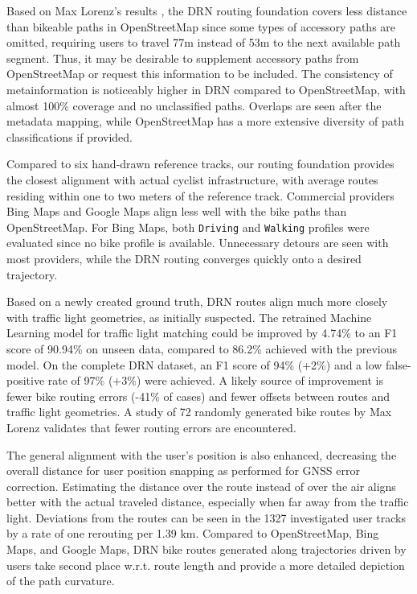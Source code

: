 \begin{Summary}
Based on Max Lorenz's results \cite{lorenz_2022}, the DRN routing foundation covers less distance than bikeable paths in OpenStreetMap since some types of accessory paths are omitted, requiring users to travel 77m instead of 53m to the next available path segment. Thus, it may be desirable to supplement accessory paths from OpenStreetMap or request this information to be included. The consistency of metainformation is noticeably higher in DRN compared to OpenStreetMap, with almost 100\% coverage and no unclassified paths. Overlaps are seen after the metadata mapping, while OpenStreetMap has a more extensive diversity of path classifications if provided.

Compared to six hand-drawn reference tracks, our routing foundation provides the closest alignment with actual cyclist infrastructure, with average routes residing within one to two meters of the reference track. Commercial providers Bing Maps and Google Maps align less well with the bike paths than OpenStreetMap. For Bing Maps, both \texttt{Driving} and \texttt{Walking} profiles were evaluated since no bike profile is available. Unnecessary detours are seen with most providers, while the DRN routing converges quickly onto a desired trajectory. 

Based on a newly created ground truth, DRN routes align much more closely with traffic light geometries, as initially suspected. The retrained Machine Learning model for traffic light matching could be improved by 4.74\% to an F1 score of 90.94\% on unseen data, compared to 86.2\% achieved with the previous model. On the complete DRN dataset, an F1 score of 94\% (+2\%) and a low false-positive rate of 97\% (+3\%) were achieved. A likely source of improvement is fewer bike routing errors (-41\% of cases) and fewer offsets between routes and traffic light geometries. A study of 72 randomly generated bike routes by Max Lorenz \cite{lorenz_2022} validates that fewer routing errors are encountered.

The general alignment with the user's position is also enhanced, decreasing the overall distance for user position snapping as performed for GNSS error correction. Estimating the distance over the route instead of over the air aligns better with the actual traveled distance, especially when far away from the traffic light. Deviations from the routes can be seen in the 1327 investigated user tracks by a rate of one rerouting per 1.39 km. Compared to OpenStreetMap, Bing Maps, and Google Maps, DRN bike routes generated along trajectories driven by users take second place w.r.t. route length and provide a more detailed depiction of the path curvature.
\end{Summary}

